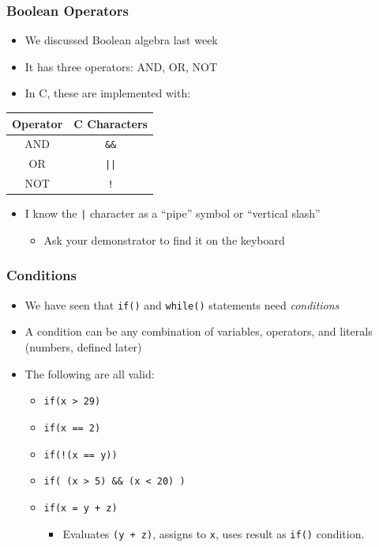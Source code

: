 \documentclass[14pt]{beamer}
\begin{document}
\begin{frame}
\frametitle{Boolean Operators}
\begin{itemize}
\item We discussed Boolean algebra last week
\item It has three operators: AND, OR, NOT
\item In C, these are implemented with:
\end{itemize}
\vspace{-5mm}
\begin{table}[]
\begin{tabular}{|c|c|}
\hline
Operator & C Characters \\
\hline
AND      & \texttt{\&\&}         \\
OR       & \texttt{||}           \\
NOT      & \texttt{!}           \\
\hline
\end{tabular}
\end{table}
\vspace{-5mm}
\begin{itemize}
\item I know the \texttt{|} character as a ``pipe'' symbol or ``vertical slash''
	\begin{itemize}
		\item Ask your demonstrator to find it on the keyboard
	\end{itemize}
\end{itemize}
\end{frame}

\begin{frame}
\frametitle{Conditions}
\begin{itemize}
\item We have seen that \texttt{if()} and \texttt{while()} statements need \textit{conditions}
\item A condition can be any combination of variables, operators, and literals (numbers, defined later)
\item The following are all valid:
	\begin{itemize}
		\item \texttt{if(x > 29)}
		\item \texttt{if(x == 2)}
		\item \texttt{if(!(x == y))}
		\item \texttt{if( (x > 5) \&\& (x < 20) )}
		\item \texttt{if(x = y + z)}
			\begin{itemize}
				\item Evaluates \texttt{(y + z)}, assigns to \texttt{x}, uses result as \texttt{if()} condition.
			\end{itemize}
	\end{itemize}
\end{itemize}
\end{frame}
\end{document}
